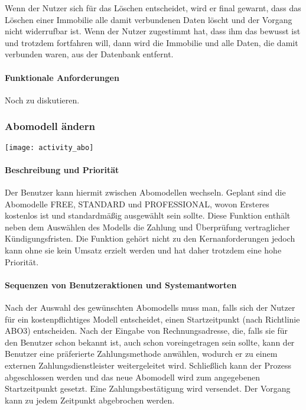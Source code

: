 Wenn der Nutzer sich für das Löschen entscheidet, wird er final gewarnt,
dass das Löschen einer Immobilie alle damit verbundenen Daten löscht und der Vorgang nicht widerrufbar ist.
Wenn der Nutzer zugestimmt hat, dass ihm das bewusst ist und trotzdem fortfahren will,
dann wird die Immobilie und alle Daten, die damit verbunden waren, aus der Datenbank entfernt.

\paragraph{Funktionale Anforderungen}
Noch zu diskutieren.

\subsubsection{Abomodell ändern}
\texttt{[image: activity\_abo]}

\paragraph{Beschreibung und Priorität}
Der Benutzer kann hiermit zwischen Abomodellen wechseln.
Geplant sind die Abomodelle FREE, STANDARD und PROFESSIONAL,
wovon Ersteres kostenlos ist und standardmäßig ausgewählt sein sollte.
Diese Funktion enthält neben dem Auswählen des Modells die Zahlung und Überprüfung vertraglicher Kündigungsfristen.
Die Funktion gehört nicht zu den Kernanforderungen jedoch kann ohne sie kein Umsatz erzielt werden
und hat daher trotzdem eine hohe Priorität.
\paragraph{Sequenzen von Benutzeraktionen und Systemantworten}
Nach der Auswahl des gewünschten Abomodells muss man, falls sich der Nutzer für ein kostenpflichtiges Modell entscheidet,
einen Startzeitpunkt (nach Richtlinie ABO3) entscheiden.
Nach der Eingabe von Rechnungsadresse, die, falls sie für den Benutzer schon bekannt ist,
auch schon voreingetragen sein sollte, kann der Benutzer eine präferierte Zahlungsmethode anwählen,
wodurch er zu einem externen Zahlungsdienstleister weitergeleitet wird.
Schließlich kann der Prozess abgeschlossen werden und das neue Abomodell wird zum angegebenen Startzeitpunkt gesetzt.
Eine Zahlungsbestätigung wird versendet.
Der Vorgang kann zu jedem Zeitpunkt abgebrochen werden.

